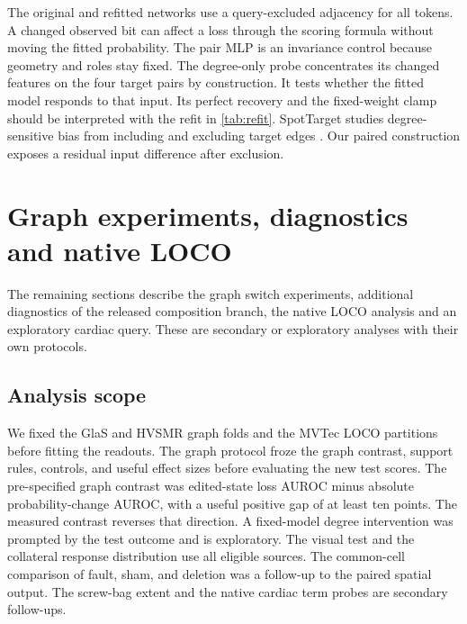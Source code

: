 \documentclass[10pt,twocolumn,letterpaper]{article}
\begin{document}
\begin{table}[t]
\centering
\caption{\textbf{Response after refitting with mean aggregation.} AUC and top-four recovery use absolute matched probability change and donor-macro aggregation. Top-four change is refit minus original in percentage points. Intervals are donor-paired. The tiers share donors.}
\label{tab:refit}
\small

\end{table}

The original and refitted networks use a query-excluded adjacency for all tokens. A changed observed bit can affect a loss through the scoring formula without moving the fitted probability. The pair MLP is an invariance control because geometry and roles stay fixed. The degree-only probe concentrates its changed features on the four target pairs by construction. It tests whether the fitted model responds to that input. Its perfect recovery and the fixed-weight clamp should be interpreted with the refit in \cref{tab:refit}. SpotTarget studies degree-sensitive bias from including and excluding target edges \cite{zhu2024spot}. Our paired construction exposes a residual input difference after exclusion.

\clearpage
\section{Graph experiments, diagnostics and native LOCO}
The remaining sections describe the graph switch experiments, additional diagnostics of the released composition branch, the native LOCO analysis and an exploratory cardiac query. These are secondary or exploratory analyses with their own protocols.

\subsection{Analysis scope}
We fixed the GlaS and HVSMR graph folds and the MVTec LOCO partitions before fitting the readouts. The graph protocol froze the graph contrast, support rules, controls, and useful effect sizes before evaluating the new test scores. The pre-specified graph contrast was edited-state loss AUROC minus absolute probability-change AUROC, with a useful positive gap of at least ten points. The measured contrast reverses that direction. A fixed-model degree intervention was prompted by the test outcome and is exploratory. The visual test and the collateral response distribution use all eligible sources. The common-cell comparison of fault, sham, and deletion was a follow-up to the paired spatial output. The screw-bag extent and the native cardiac term probes are secondary follow-ups.
\end{document}
